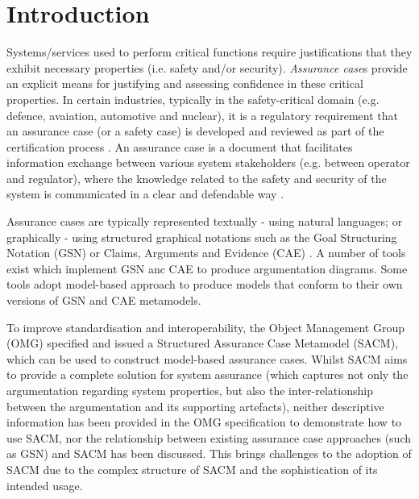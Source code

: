\section{Introduction}
Systems/services used to perform critical functions require justifications that they exhibit necessary properties (i.e. safety and/or security). \textit{Assurance case}s provide an explicit means for justifying and assessing confidence in these critical properties. In certain industries, typically in the safety-critical domain (e.g. defence, avaiation, automotive and nuclear), it is a regulatory requirement that an assurance case (or a safety case) is developed and reviewed as part of the certification process \cite{healthFound}.
An assurance case is a document that facilitates information exchange between various system stakeholders (e.g. between operator and regulator), where the knowledge related to the safety and security of the system is communicated in a clear and defendable way \cite{hawkins2013assurance}. 

Assurance cases are typically represented textually - using natural languages; or graphically - using structured graphical notations such as the Goal Structuring Notation (GSN) \cite{kelly2004goal} or Claims, Arguments and Evidence (CAE) \cite{cae}. A number of tools exist which implement GSN anc CAE to produce argumentation diagrams. Some tools adopt model-based approach to produce models that conform to their own versions of GSN and CAE metamodels. 


To improve standardisation and interoperability, the Object Management Group (OMG) specified and issued a Structured Assurance Case Metamodel (SACM), which can be used to construct model-based assurance cases. 
Whilst SACM aims to provide a complete solution for system assurance (which captures not only the argumentation regarding system properties, but also the inter-relationship between the argumentation and its supporting artefacts), neither descriptive information has been provided in the OMG specification to demonstrate how to use SACM, nor the relationship between existing assurance case approaches (such as GSN) and SACM has been discussed. This brings challenges to the adoption of SACM due to the complex structure of SACM and the sophistication of its intended usage. 

